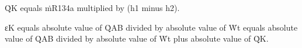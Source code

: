 Q̇K equals ṁR134a multiplied by (h1 minus h2).  

εK equals absolute value of Q̇AB divided by absolute value of Ẇt equals absolute value of Q̇AB divided by absolute value of Ẇt plus absolute value of Q̇K.